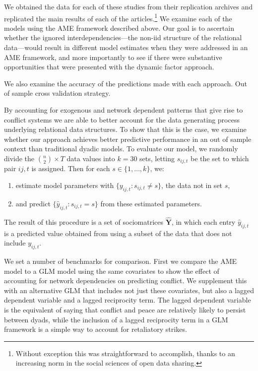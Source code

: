 \documentclass[12pt]{amsart}
\begin{document}
We obtained the data for each of these studies from their replication archives and replicated the main results of each of the articles.\footnote{Without exception this was straightforward to accomplish, thanks to an increasing norm in the social sciences of open data sharing.} We examine each of the models using the AME framework described above.  Our goal is to ascertain whether the ignored interdependencies---the non-iid structure of the relational data---would result in different model estimates when they were addressed in an AME framework, and more importantly to see if there were substantive opportunities that were presented with the dynamic factor approach.  


We also examine the accuracy of the predictions made with each approach. Out of sample cross validation strategy. 

By accounting for exogenous and network dependent patterns that give rise to conflict systems we are able to better account for the data generating process underlying relational data structures. To show that this is the case, we examine whether our approach achieves better predictive performance in an out of sample context than traditional dyadic models. To evaluate our model, we randomly divide the $\binom n 2 \times T$ data values into $k=30$ sets, letting $s_{ij,t}$ be the set to which pair $ij,t$ is assigned. Then for each $s \in \{1,\ldots,k\}$, we:

\begin{enumerate}
	\item estimate model parameters with $\{y_{ij,t}: s_{ij,t} \neq s\}$, the data not in set $s$,
	\item and predict $\{\hat{y}_{ij,t}: s_{ij,t} = s\}$ from these estimated parameters. 
\end{enumerate}

\noindent The result of this procedure is a set of sociomatrices $\bm \hat Y$, in which each entry $\hat y_{ij,t}$ is a predicted value obtained from using a subset of the data that does not include $y_{ij,t}$. 

We set a number of benchmarks for comparison. First we compare the AME model to a GLM model using the same covariates to show the effect of accounting for network dependencies on predicting conflict. We supplement this with an alternative GLM that includes not just these covariates, but also a lagged dependent variable and a lagged reciprocity term. The lagged dependent variable is the equivalent of saying that conflict and peace are relatively likely to persist between dyads, while the inclusion of a lagged reciprocity term in a GLM framework is a simple way to account for retaliatory strikes.
\end{document}
